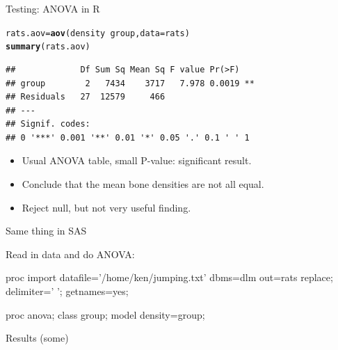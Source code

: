 \documentclass[unknownkeysallowed]{beamer}\usepackage[]{graphicx}\usepackage[]{color}
\makeatletter
\newcommand{\hlopt}[1]{\textcolor[rgb]{0,0,0}{#1}}%
\newcommand{\hlstd}[1]{\textcolor[rgb]{0.345,0.345,0.345}{#1}}%
\newcommand{\hlkwb}[1]{\textcolor[rgb]{0.69,0.353,0.396}{#1}}%
\newcommand{\hlkwc}[1]{\textcolor[rgb]{0.333,0.667,0.333}{#1}}%
\newcommand{\hlkwd}[1]{\textcolor[rgb]{0.737,0.353,0.396}{\textbf{#1}}}%
\newenvironment{kframe}{%
 \def\at@end@of@kframe{}%
 \ifinner\ifhmode%
  \def\at@end@of@kframe{\end{minipage}}%
  \begin{minipage}{\columnwidth}%
 \fi\fi%
 \def\FrameCommand##1{\hskip\@totalleftmargin \hskip-\fboxsep
 \colorbox{shadecolor}{##1}\hskip-\fboxsep
     \hskip-\linewidth \hskip-\@totalleftmargin \hskip\columnwidth}%
 \MakeFramed {\advance\hsize-\width
   \@totalleftmargin\z@ \linewidth\hsize
   \@setminipage}}%
 {\par\unskip\endMakeFramed%
 \at@end@of@kframe}
\newenvironment{knitrout}{}{} %
\makeatother
\begin{document}
\begin{frame}[fragile]{Testing: ANOVA in R}

\begin{knitrout}
\color{fgcolor}\begin{kframe}
\begin{alltt}
    \hlstd{rats.aov}\hlkwb{=}\hlkwd{aov}\hlstd{(density}\hlopt{~}\hlstd{group,}\hlkwc{data}\hlstd{=rats)}
    \hlkwd{summary}\hlstd{(rats.aov)}
\end{alltt}
\begin{verbatim}
##             Df Sum Sq Mean Sq F value Pr(>F)   
## group        2   7434    3717   7.978 0.0019 **
## Residuals   27  12579     466                  
## ---
## Signif. codes:  
## 0 '***' 0.001 '**' 0.01 '*' 0.05 '.' 0.1 ' ' 1
\end{verbatim}
\end{kframe}
\end{knitrout}

\begin{itemize}
\item Usual ANOVA table, small P-value: significant result.
\item Conclude that the mean bone densities are not all equal.
\item Reject null, but not very useful finding.
\end{itemize}
  
\end{frame}

\begin{frame}[fragile]{Same thing in SAS}

Read in data and do ANOVA:

\begin{Datastep}
proc import
  datafile='/home/ken/jumping.txt'
    dbms=dlm
    out=rats
    replace;
  delimiter=' ';
  getnames=yes;
\end{Datastep}


\begin{Sascode}[store=ih]
proc anova;
  class group;
  model density=group;
\end{Sascode}

  
\end{frame}

\begin{frame}[fragile]{Results (some)}

  
\end{frame}
\end{document}
